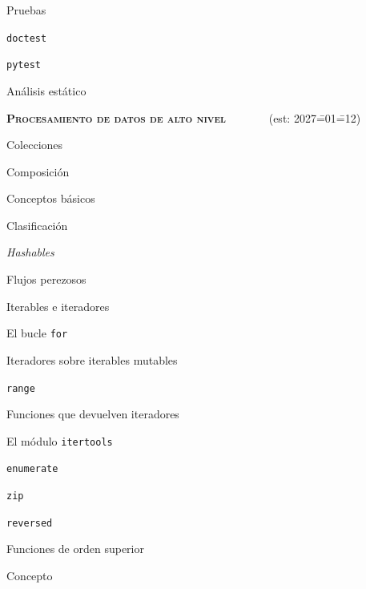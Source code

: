 \begin{longenum}
\begin{longenum}
\begin{longenum}
\begin{longenum}
            \end{longenum}
            \item Pruebas
            \begin{longenum}
                \item \texttt{doctest}
                \item \texttt{pytest}
            \end{longenum}
            \item Análisis estático
        \end{longenum}
    \end{longenum}
    \item \textbf{\textsc{Procesamiento de datos de alto nivel}} \ \ \ \ \ \ \ (est: 2027\==01\==12)
    \begin{longenum}
        \item Colecciones
        \begin{longenum}
            \item Composición
            \item Conceptos básicos
            \item Clasificación
            \item \textit{Hashables}
        \end{longenum}
        \item Flujos perezosos
        \begin{longenum}
            \item Iterables e iteradores
            \item El bucle \texttt{for}
            \item Iteradores sobre iterables mutables
            \item \texttt{range}
            \item Funciones que devuelven iteradores
            \begin{longenum}
                \item El módulo \texttt{itertools}
                \item \texttt{enumerate}
                \item \texttt{zip}
                \item \texttt{reversed}
            \end{longenum}
        \end{longenum}
        \item Funciones de orden superior
        \begin{longenum}
            \item Concepto

\end{longenum}
\end{longenum}
\end{longenum}
